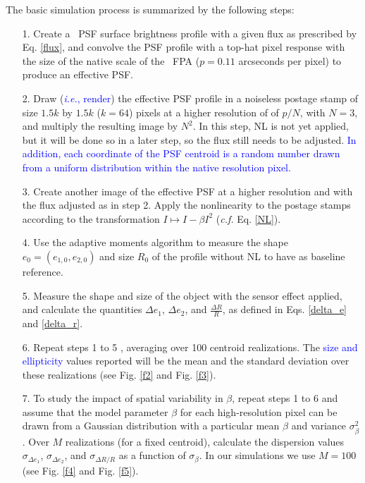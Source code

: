 \documentclass[preprint]{aastex}
\begin{document}
The basic simulation process is summarized by the following steps:  
\begin{itemize}
\item[1.] Create a \wfa\ PSF surface brightness profile with a given flux as prescribed by Eq. \ref{flux}, and convolve the PSF profile with a top-hat pixel response with the size of the native scale of the \wfa\ FPA ($p=0.11$ arcseconds per pixel) to produce an effective PSF. 
\item[2.] Draw (\textcolor{blue}{\emph{i.e.}, render}) the effective PSF profile in a noiseless postage stamp of size $1.5k$ by $1.5k$ ($k=64$) pixels at a higher resolution of of $p/N$, with $N=3$, and multiply the resulting image by $N^2$. In this step, NL is not yet applied, but it will be done so in a later step, so the flux still needs to be adjusted. \textcolor{blue} {In addition, each coordinate of the PSF centroid is a random number drawn from a uniform distribution within the native resolution pixel.}
\item[3.] Create another image of the effective PSF at a higher resolution and with the flux adjusted as in step 2. 
Apply the nonlinearity to the postage stamps according to the transformation $I \mapsto I - \beta I^2$ (\emph{c.f.} Eq. \ref{NL}).
\item[4.] Use the adaptive moments algorithm to measure the shape $e_0=(e_{1,0}, e_{2,0})$ and size $R_0$ of the profile without NL to have as baseline reference.
\item[5.] Measure the shape and size of the object with the sensor effect applied, and calculate the quantities $\Delta e_1$, $\Delta e_2$, and $\frac{\Delta R}{R}$, as defined in Eqs. \ref{delta_e} and \ref{delta_r}. 
\item [6.] Repeat steps 1 to 5 %
, averaging over 100 centroid realizations. The  \textcolor{blue}{ size and ellipticity} values reported will be the mean and the standard deviation over these realizations (see Fig. \ref{f2} and Fig. \ref{f3}).
\item[7.] To study the impact of spatial variability in $\beta$, repeat steps 1 to 6 and assume that the model parameter $\beta$ for each high-resolution pixel can be drawn from a Gaussian distribution with a particular mean $\beta$ and variance $\sigma_{\beta}^2$. Over $M$ realizations (for a fixed centroid), calculate the dispersion values $\sigma_{\Delta e_1}$, $\sigma_{\Delta e_2}$, and $\sigma_{\Delta R/R}$ as a function of $\sigma_{\beta}$. In our simulations we use $M=100$ (see Fig. \ref{f4} and Fig. \ref{f5}). 

\end{itemize}
\end{document}
